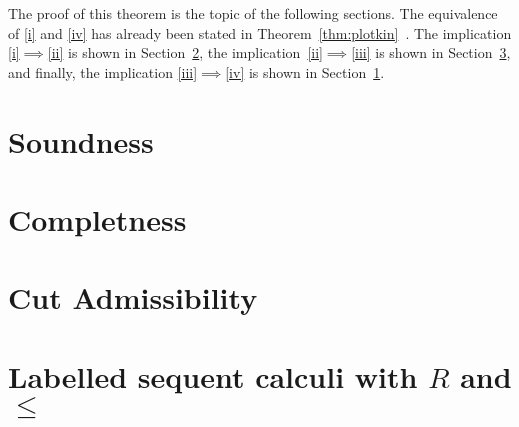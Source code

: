 \documentclass[a4paper]{article}
\theoremstyle{plain}
\theoremstyle{definition}
\newcommand*{\rel}{R}
\begin{document}
The proof of this theorem is the topic of the following sections. The
equivalence of \ref{i} and \ref{iv} has already been stated in
Theorem~\ref{thm:plotkin}~\cite{Fischer,Plotkin}. The implication
\ref{i}$\implies$\ref{ii} is shown in Section~\ref{sec:completeness},
the implication~\ref{ii}$\implies$\ref{iii} is shown in
Section~\ref{sec:cut-elim}, and finally, the implication
\ref{iii}$\implies$\ref{iv} is shown in Section~\ref{sec:soundness}.


\section{Soundness}\label{sec:soundness}


\section{Completness}\label{sec:completeness}


\section{Cut Admissibility}\label{sec:cut-elim}



\section{Labelled sequent calculi with $\rel$ and $\le$}
\end{document}
